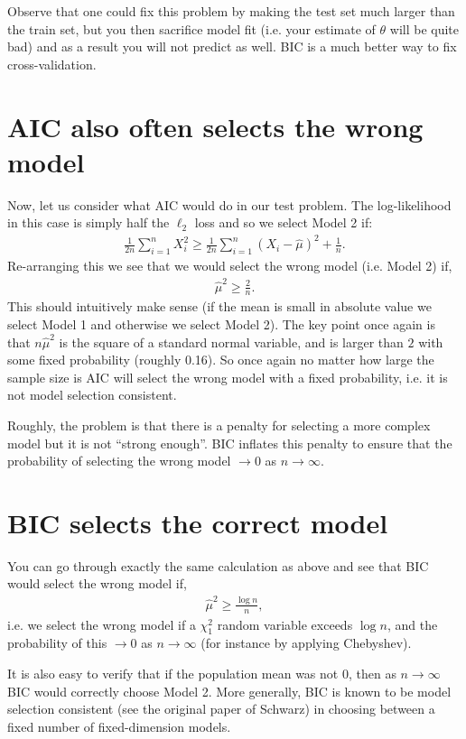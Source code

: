 \documentclass[twoside,12pt]{article}
\begin{document}
Observe that one could fix this problem by making the test set much larger than the train set, but you then sacrifice model fit (i.e. your estimate of $\theta$ will be quite bad) and as a result you will not predict as well. BIC is a much better way to fix cross-validation.

\section{AIC also often selects the wrong model}
Now, let us consider what AIC would do in our test problem. The log-likelihood in this case is simply half the $\ell_2$ loss and so we select Model 2 if:
\begin{align*}
\frac{1}{2n} \sum_{i=1}^n X_i^2 \geq \frac{1}{2n} \sum_{i=1}^n (X_i - \widehat{\mu})^2 + \frac{1}{n}.
\end{align*}
Re-arranging this we see that we would select the wrong model (i.e. Model 2) if, 
\begin{align*}
\widehat{\mu}^2 \geq \frac{2}{n}.
\end{align*}
This should intuitively make sense (if the mean is small in absolute value we select Model 1 and otherwise we select Model 2). The key point once again is that $n \widehat{\mu}^2$ is the square of a standard normal variable, and is larger than $2$ with some fixed probability (roughly 0.16). So once again no matter how large the sample size is AIC will select the wrong model with a fixed probability, i.e. it is not model selection consistent.

Roughly, the problem is that there is a penalty for selecting a more complex model but it is not ``strong enough''. BIC inflates this penalty to ensure that the probability of selecting the wrong model $\rightarrow 0$ as $n \rightarrow \infty$.


\section{BIC selects the correct model}
You can go through exactly the same calculation as above and see that BIC would select the wrong model if,
\begin{align*}
\widehat{\mu}^2 \geq \frac{\log n}{n},
\end{align*}
i.e. we select the wrong model if a $\chi^2_1$ random variable exceeds $\log n$, and the probability of this $\rightarrow 0$ as $n \rightarrow \infty$ (for instance by applying Chebyshev).

It is also easy to verify that if the population mean was not 0, then as $n \rightarrow \infty$ BIC would correctly choose Model 2. More generally, BIC is known to be model selection consistent (see the original paper of Schwarz) in choosing between a fixed number of fixed-dimension models. 
\end{document}
